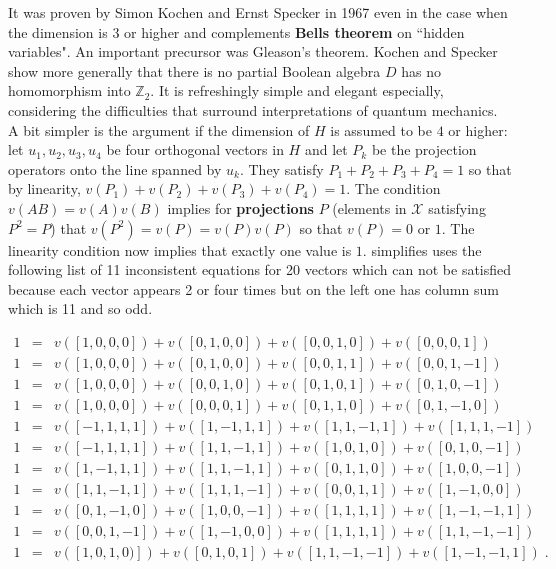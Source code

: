 \documentclass[12pt]{amsart}
\begin{document}
It was proven by Simon Kochen and Ernst Specker in 1967 \cite{KochenSpecker}
even in the case when the dimension is $3$ or higher
and complements {\bf Bells theorem} on ``hidden variables". An important precursor was
Gleason's theorem. Kochen and Specker show more generally
that there is no partial Boolean algebra $D$ has no homomorphism into $\mathbb{Z}_2$.
It is refreshingly simple and elegant especially, considering the
difficulties that surround interpretations of quantum mechanics.  A bit simpler
is the argument if the dimension of $H$ is assumed to be $4$ or higher:
let $u_1,u_2,u_3,u_4$ be four orthogonal vectors in $H$ and let $P_k$ be the projection 
operators onto the line spanned by $u_k$. They satisfy $P_1+P_2+P_3+P_4=1$ so that by 
linearity, $v(P_1)+v(P_2)+v(P_3)+v(P_4)=1$. 
The condition $v(A B) = v(A) v(B)$ implies for {\bf projections} $P$ 
(elements in $\mathcal{X}$ satisfying $P^2=P$) that $v(P^2)=v(P)=v(P) v(P)$ so
that $v(P)=0$ or $1$. The linearity condition now implies that exactly one value is $1$. 
\cite{Kernaghan1994} simplifies \cite{Peres1991} uses the following list of 11 inconsistent
equations for 20 vectors which can not be satisfied because each vector appears 2 or four times
but on the left one has column sum which is 11 and so odd.
\begin{tiny}
\begin{eqnarray*}
    1&=&v([1,0,0,0]) + v([0,1,0,0]) + v([0,0,1,0]) + v([0,0,0,1]) \\
    1&=&v([1,0,0,0]) + v([0,1,0,0]) + v([0,0,1,1]) + v([0,0,1,-1]) \\
    1&=&v([1,0,0,0]) + v([0,0,1,0]) + v([0,1,0,1]) + v([0,1,0,-1]) \\
    1&=&v([1,0,0,0]) + v([0,0,0,1]) + v([0,1,1,0]) + v([0,1,-1,0]) \\
    1&=&v([-1,1,1,1]) + v([1,-1,1,1]) + v([1,1,-1,1]) + v([1,1,1,-1]) \\
    1&=&v([-1,1,1,1]) + v([1,1,-1,1]) + v([1,0,1,0]) + v([0,1,0,-1]) \\
    1&=&v([1,-1,1,1]) + v([1,1,-1,1]) + v([0,1,1,0]) + v([1,0,0,-1]) \\
    1&=&v([1,1,-1,1]) + v([1,1,1,-1]) + v([0,0,1,1]) + v([1,-1,0,0]) \\
    1&=&v([0,1,-1,0]) + v([1,0,0,-1]) + v([1,1,1,1]) + v([1,-1,-1,1]) \\
    1&=&v([0,0,1,-1]) + v([1,-1,0,0]) + v([1,1,1,1]) + v([1,1,-1,-1]) \\
    1&=&v([1,0,1,0)]) + v([0,1,0,1])  + v([1,1,-1,-1]) + v([1,-1,-1,1])  \; .
\end{eqnarray*}
\end{tiny}
\end{document}
